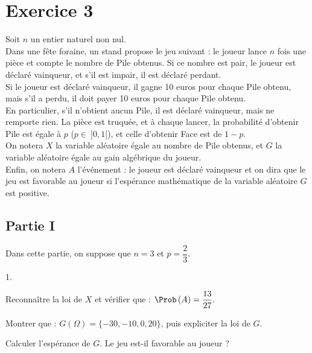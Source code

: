\documentclass[11pt]{article}%
\begin{document}
\section*{Exercice 3}

\noindent
Soit $n$ un entier naturel non nul.\\
Dans une fête foraine, un stand propose le jeu suivant : le joueur
lance $n$ fois une pièce et compte le nombre de Pile obtenus. Si ce
nombre est pair, le joueur est déclaré vainqueur, et s'il est impair,
il est déclaré perdant.\\
Si le joueur est déclaré vainqueur, il gagne 10 euros pour chaque Pile
obtenu, mais s'il a perdu, il doit payer 10 euros pour chaque Pile
obtenu.\\
En particulier, s'il n'obtient aucun Pile, il est déclaré vainqueur,
mais ne remporte rien. La pièce est truquée, et à chaque lancer, la
probabilité d'obtenir Pile est égale à $p$ ($p \in \ ]0,1[$), et celle
d'obtenir Face est de $1-p$.\\
On notera $X$ la variable aléatoire égale au nombre de Pile obtenus,
et $G$ la variable aléatoire égale au gain algébrique du joueur.\\
Enfin, on notera $A$ l'événement : \og le joueur est déclaré
vainqueur \fg{} et on dira que le jeu est favorable au joueur si
l'espérance mathématique de la variable aléatoire $G$ est positive.





\subsection*{Partie I}
 
\noindent
Dans cette partie, on suppose que $n = 3$ et $p = \dfrac{2}{3}$.
\begin{noliste}{1.}
  \setlength{\itemsep}{4mm}
\item Reconnaître la loi de $X$ et vérifier que : $\Prob\left(A\right)
  = \dfrac{13}{27}$.

  

\item Montrer que : $G(\Omega) = \{-30, -10, 0, 20\}$, puis expliciter
  la loi de $G$.

  

\item Calculer l'espérance de $G$. Le jeu est-il favorable au joueur ?
  
  
\end{noliste}
\end{document}
